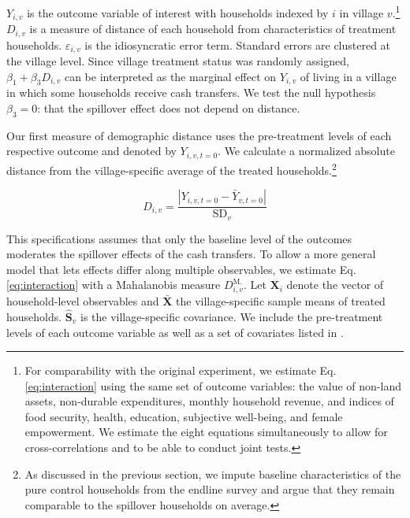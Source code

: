 \documentclass[11pt]{article}
\begin{document}
        $Y_{i,v}$ is the outcome variable of interest with households indexed by $i$ in village $v$.\footnote{For comparability with the original experiment, we estimate Eq. \ref{eq:interaction} using the same set of outcome variables: the value of non-land assets, non-durable expenditures, monthly household revenue, and indices of food security, health, education, subjective well-being, and female empowerment. We estimate the eight equations simultaneously to allow for cross-correlations and to be able to conduct joint tests.} $D_{i,v}$ is a measure of distance of each household from characteristics of treatment households. $\varepsilon_{i,v}$ is the idiosyncratic error term. Standard errors are clustered at the village level. Since village treatment status was randomly assigned, $\beta_1 + \beta_3 D_{i,v}$ can be interpreted as the marginal effect on $Y_{i,v}$ of living in a village in which some households receive cash transfers. We test the null hypothesis $\beta_3 = 0$: that the spillover effect does not depend on distance.

        Our first measure of demographic distance uses the pre-treatment levels of each respective outcome and denoted by $Y_{i,v,t=0}$. We calculate a normalized absolute distance from the village-specific average of the treated households.\footnote{As discussed in the previous section, we impute baseline characteristics of the pure control households from the endline survey and argue that they remain comparable to the spillover households on average.}

            \begin{equation} \label{eq:absdev}
            D_{i,v} = \frac{|Y_{i,v,t=0} - \bar Y_{v,t=0}|}{\text{SD}_v}
            \end{equation}


        This specifications assumes that only the baseline level of the outcomes moderates the spillover effects of the cash transfers. To allow a more general model that lets effects differ along multiple observables, we estimate Eq. \ref{eq:interaction} with a Mahalanobis measure $D^\text{M.}_{i,v}$. Let $\mathbf X_i$ denote the vector of household-level observables and $\mathbf{\bar X}$ the village-specific sample means of treated households. $\mathbf{\hat S}_v$ is the village-specific covariance. We include the pre-treatment levels of each outcome variable as well as a set of covariates listed in \textcite{haushofer_short-term_2016}.
\end{document}
